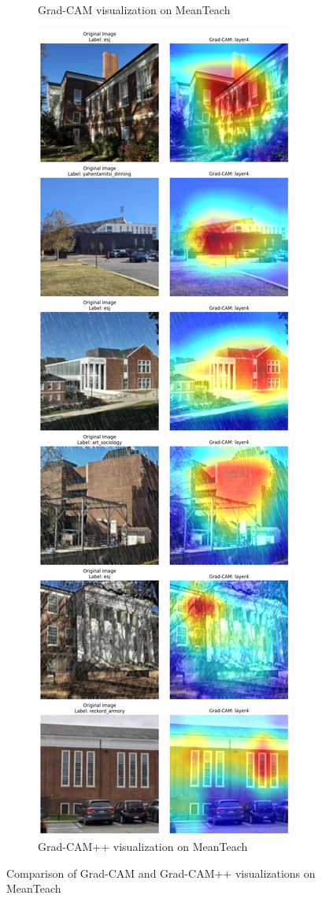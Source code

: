 \documentclass{article}
\begin{document}
\begin{figure}[H]
\begin{subfigure}[b]{0.45\linewidth}
        \caption{Grad-CAM visualization on MeanTeach}
        \label{fig:gradcam3}
    \end{subfigure}
    \hfill  %
    \begin{subfigure}[b]{0.45\linewidth}
        \centering
        \includegraphics[width=\linewidth]{mean_teach_gradcam_plusplus.png}
        \caption{Grad-CAM++ visualization on MeanTeach}
        \label{fig:gradcam4}
    \end{subfigure}

    \caption{Comparison of Grad-CAM and Grad-CAM++ visualizations on MeanTeach}
    \label{fig:gradcam_comparison2}
\end{figure}

\medskip


\small




\end{document}
